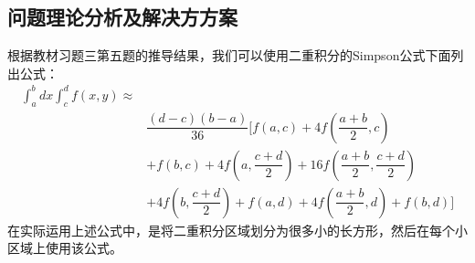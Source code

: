\documentclass{ctexart}
\begin{document}
\subsection{问题理论分析及解决方方案}
根据教材习题三第五题的推导结果，我们可以使用二重积分的Simpson公式下面列出公式：
\begin{equation*}
\begin{split}
\int_{a}^{b}dx\int_{c}^{d}f(x,y)\approx \\ 
&\dfrac{(d-c)(b-a)}{36}[f(a,c)+4f(\dfrac{a+b}{2},c)\\
&+f(b,c)+4f(a,\dfrac{c+d}{2})+16f(\dfrac{a+b}{2},\dfrac{c+d}{2})\\
&+4f(b,\dfrac{c+d}{2})+f(a,d)+4f(\dfrac{a+b}{2},d)+f(b,d)]
\end{split}
\end{equation*}
在实际运用上述公式中，是将二重积分区域划分为很多小的长方形，然后在每个小区域上使用该公式。
\end{document}
